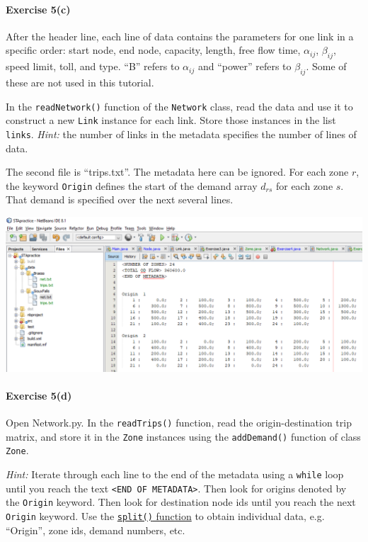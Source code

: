 \documentclass[11pt]{article}
\begin{document}
\paragraph*{Exercise 5(c)} After the header line, each line of data contains the parameters for one link in a specific order: start node, end node, capacity, length, free flow time, $\alpha_{ij}$, $\beta_{ij}$, speed limit, toll, and type. ``B'' refers to $\alpha_{ij}$ and ``power'' refers to $\beta_{ij}$. Some of these are not used in this tutorial. 

In the \texttt{readNetwork()} function of the \texttt{Network} class, read the data and use it to construct a new \texttt{Link} instance for each link. Store those instances in the list \texttt{links}.
 \textit{Hint:} the number of links in the metadata specifies the number of lines of data. 


\vspace{\baselineskip}

\noindent
The second file is ``trips.txt''. The metadata here can be ignored. For each zone $r$, the keyword \texttt{Origin} defines the start of the demand array $d_{rs}$ for each zone $s$. That demand is specified over the next several lines.

\begin{center}
	\includegraphics[width=\textwidth]{netbeans7.png}
\end{center}

\paragraph*{Exercise 5(d)} Open Network.py. In the \texttt{readTrips()} function, read the origin-destination trip matrix, and store it in the \texttt{Zone} instances using the \texttt{addDemand()} function of class \texttt{Zone}. 

\textit{Hint:} Iterate through each line to the end of the metadata using a \texttt{while} loop until you reach the text \texttt{<END OF METADATA>}. Then look for origins denoted by the \texttt{Origin} keyword. Then look for destination node ids until you reach the next \texttt{Origin} keyword. Use the \href{https://www.w3schools.com/python/ref_string_split.asp}{\texttt{split()} function} to obtain individual data, e.g. ``Origin'', zone ids, demand numbers, etc.
\end{document}
